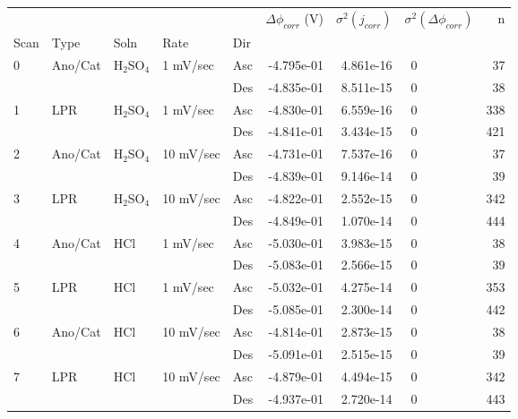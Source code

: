 \begin{tabular}{lllllrrlr}
\toprule
  &     &     &           &     &  $\Delta \phi_{corr}$ (V) &  $\sigma^2(j_{corr})$ & $\sigma^2(\Delta \phi_{corr})$ &    n \\
Scan & Type & Soln & Rate & Dir &                           &                       &                                &      \\
\midrule
0 & Ano/Cat & H$_2$SO$_4$ & 1 mV/sec & Asc &                -4.795e-01 &             4.861e-16 &                             ~0 &   37 \\
  &     &     &           & Des &                -4.835e-01 &             8.511e-15 &                             ~0 &   38 \\
1 & LPR & H$_2$SO$_4$ & 1 mV/sec & Asc &                -4.830e-01 &             6.559e-16 &                             ~0 &  338 \\
  &     &     &           & Des &                -4.841e-01 &             3.434e-15 &                             ~0 &  421 \\
2 & Ano/Cat & H$_2$SO$_4$ & 10 mV/sec & Asc &                -4.731e-01 &             7.537e-16 &                             ~0 &   37 \\
  &     &     &           & Des &                -4.839e-01 &             9.146e-14 &                             ~0 &   39 \\
3 & LPR & H$_2$SO$_4$ & 10 mV/sec & Asc &                -4.822e-01 &             2.552e-15 &                             ~0 &  342 \\
  &     &     &           & Des &                -4.849e-01 &             1.070e-14 &                             ~0 &  444 \\
4 & Ano/Cat & HCl & 1 mV/sec & Asc &                -5.030e-01 &             3.983e-15 &                             ~0 &   38 \\
  &     &     &           & Des &                -5.083e-01 &             2.566e-15 &                             ~0 &   39 \\
5 & LPR & HCl & 1 mV/sec & Asc &                -5.032e-01 &             4.275e-14 &                             ~0 &  353 \\
  &     &     &           & Des &                -5.085e-01 &             2.300e-14 &                             ~0 &  442 \\
6 & Ano/Cat & HCl & 10 mV/sec & Asc &                -4.814e-01 &             2.873e-15 &                             ~0 &   38 \\
  &     &     &           & Des &                -5.091e-01 &             2.515e-15 &                             ~0 &   39 \\
7 & LPR & HCl & 10 mV/sec & Asc &                -4.879e-01 &             4.494e-15 &                             ~0 &  342 \\
  &     &     &           & Des &                -4.937e-01 &             2.720e-14 &                             ~0 &  443 \\
\bottomrule
\end{tabular}
